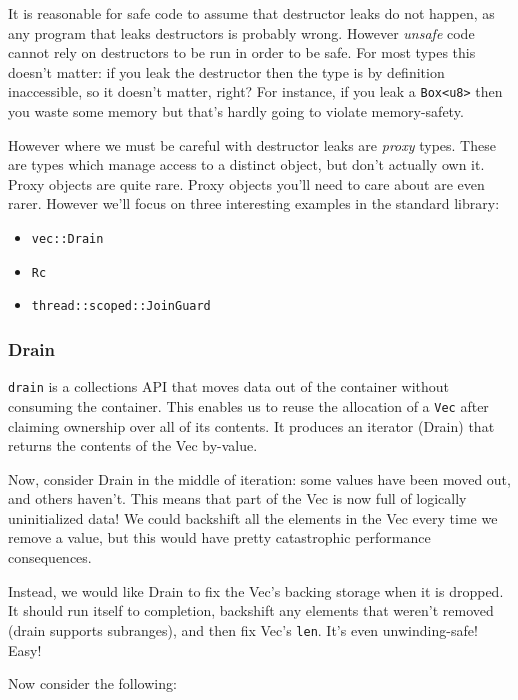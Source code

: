 \documentclass[a4paper,]{book}
\begin{document}
It is reasonable for safe code to assume that destructor leaks do not
happen, as any program that leaks destructors is probably wrong. However
\emph{unsafe} code cannot rely on destructors to be run in order to be
safe. For most types this doesn't matter: if you leak the destructor
then the type is by definition inaccessible, so it doesn't matter,
right? For instance, if you leak a
\texttt{Box\textless{}u8\textgreater{}} then you waste some memory but
that's hardly going to violate memory-safety.

However where we must be careful with destructor leaks are \emph{proxy}
types. These are types which manage access to a distinct object, but
don't actually own it. Proxy objects are quite rare. Proxy objects
you'll need to care about are even rarer. However we'll focus on three
interesting examples in the standard library:

\begin{itemize}
\itemsep1pt\parskip0pt
\item
  \texttt{vec::Drain}
\item
  \texttt{Rc}
\item
  \texttt{thread::scoped::JoinGuard}
\end{itemize}

\subsubsection{Drain}\label{drain}

\texttt{drain} is a collections API that moves data out of the container
without consuming the container. This enables us to reuse the allocation
of a \texttt{Vec} after claiming ownership over all of its contents. It
produces an iterator (Drain) that returns the contents of the Vec
by-value.

Now, consider Drain in the middle of iteration: some values have been
moved out, and others haven't. This means that part of the Vec is now
full of logically uninitialized data! We could backshift all the
elements in the Vec every time we remove a value, but this would have
pretty catastrophic performance consequences.

Instead, we would like Drain to fix the Vec's backing storage when it is
dropped. It should run itself to completion, backshift any elements that
weren't removed (drain supports subranges), and then fix Vec's
\texttt{len}. It's even unwinding-safe! Easy!

Now consider the following:
\end{document}
